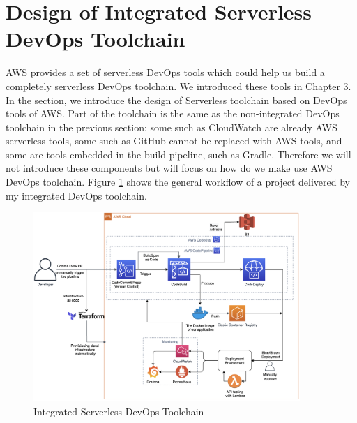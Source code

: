 \section{Design of Integrated Serverless DevOps Toolchain}
AWS provides a set of serverless DevOps tools which could help us build a completely serverless DevOps toolchain. We introduced these tools in Chapter 3. In the section, we introduce the design of Serverless toolchain based on DevOps tools of AWS. Part of the toolchain is the same as the non-integrated DevOps toolchain in the previous section: some such as CloudWatch are already AWS serverless tools, some such as GitHub cannot be replaced with AWS tools, and some are tools embedded in the build pipeline, such as Gradle. Therefore we will not introduce these components but will focus on how do we make use AWS DevOps toolchain. Figure \ref{fig:codepipeline} shows the general workflow of a project delivered by my integrated DevOps toolchain.
\begin{figure}[h]
 \centering
 \includegraphics[width=0.90\textwidth]{pics/codepipeline.png}
 \caption{Integrated Serverless DevOps Toolchain}
 \label{fig:codepipeline}
\end{figure}
